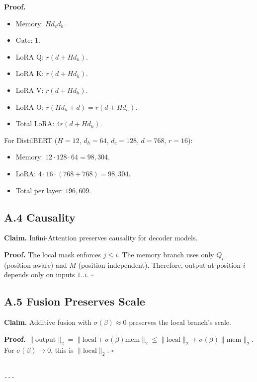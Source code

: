 \textbf{Proof.} 
\begin{itemize}
\item Memory: $H d_c d_h$.
\item Gate: 1.
\item LoRA Q: $r(d + H d_h)$.
\item LoRA K: $r(d + H d_h)$.
\item LoRA V: $r(d + H d_h)$.
\item LoRA O: $r(H d_h + d) = r(d + H d_h)$.
\item Total LoRA: $4 r(d + H d_h)$.

\end{itemize}
For DistilBERT ($H = 12$, $d_h = 64$, $d_c = 128$, $d = 768$, $r = 16$):
\begin{itemize}
\item Memory: $12 \cdot 128 \cdot 64 = 98,304$.
\item LoRA: $4 \cdot 16 \cdot (768 + 768) = 98,304$.
\item Total per layer: $196,609$.

\end{itemize}
\subsection{A.4 Causality}

\textbf{Claim.} Infini-Attention preserves causality for decoder models.

\textbf{Proof.} The local mask enforces $j \leq i$. The memory branch uses only 
$Q_i$ (position-aware) and $M$ (position-independent). Therefore, output 
at position $i$ depends only on inputs $1..i$. $\square$

\subsection{A.5 Fusion Preserves Scale}

\textbf{Claim.} Additive fusion with $\sigma(\beta) \approx 0$ preserves the 
local branch's scale.

\textbf{Proof.} $\|\text{output}\|_2 = \|\text{local} + \sigma(\beta) \text{mem}\|_2 \leq \|\text{local}\|_2 + \sigma(\beta)\|\text{mem}\|_2$. 
For $\sigma(\beta) \to 0$, this is $\|\text{local}\|_2$. $\square$
\begin{lstlisting}

---
\end{lstlisting}
